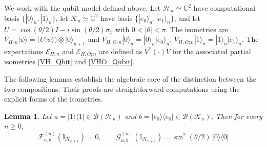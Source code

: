 \documentclass[11pt, reco]{article}
\newtheorem{lemma}[theorem]{Lemma}
\begin{document}
We work with the qubit model defined above. Let $\mathcal{H}_n \simeq \mathbb{C}^2$ have computational basis $\{|0\rangle_n, |1\rangle_n\}$, let $\mathcal{K}_n \simeq \mathbb{C}^2$ have basis $\{|e_0\rangle_n, |e_1\rangle_n\}$, and let $U = \cos(\theta/2)I - i\sin(\theta/2)\sigma_x$ with $0 < |\theta| < \pi$. The isometries are $V_{H;n}|\psi\rangle = (U|\psi\rangle) \otimes |0\rangle_{n+1}$ and $V_{H,O;n}|0\rangle_n = |0\rangle_n|e_0\rangle_n$, $V_{H,O;n}|1\rangle_n = |1\rangle_n|e_1\rangle_n$. The expectations $\mathcal{E}_{H;n}$ and $\mathcal{E}_{H,O;n}$ are defined as $V^*(\cdot)V$ for the associated partial isometries \eqref{VH_Qbit} and \eqref{VHO_Qubit}.

The following lemmas establish the algebraic core of the distinction between the two compositions. Their proofs are straightforward computations using the explicit forms of the isometries.

\begin{lemma}\label{lem:vanishing-pair}
Let $a = |1\rangle\langle 1| \in \mathcal{B}(\mathcal{H}_n)$ and $b = |e_0\rangle\langle e_0| \in \mathcal{B}(\mathcal{K}_n)$. Then for every $n \ge 0$,
\[
\mathcal{F}^{(n)}_{a,b}(\mathbb{I}_{\mathcal{H}_{n+1}}) = 0, \qquad
\mathcal{G}^{(n)}_{a,b}(\mathbb{I}_{\mathcal{H}_{n+1}}) = \sin^2(\theta/2) \, |0\rangle\langle 0|
\]
\end{lemma}
\end{document}
